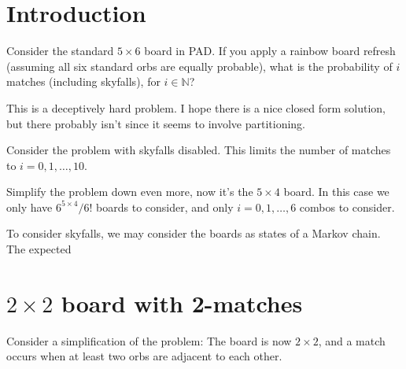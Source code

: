 \documentclass[12pt]{article}
\newcommand{\N}{\mathbb{N}}
\begin{document}
\section{Introduction}
Consider the standard $5\times 6$ board in PAD. If you apply a rainbow board refresh (assuming all six standard orbs are equally probable), what is the probability of $i$ matches (including skyfalls), for $i\in\N$?

This is a deceptively hard problem. I hope there is a nice closed form solution, but there probably isn't since it seems to involve partitioning.

Consider the problem with skyfalls disabled.
This limits the number of matches to $i=0,1,\dots,10$.

Simplify the problem down even more, now it's the $5\times 4$ board. In this case we only have $6^{5\times 4}/6!$ boards to consider, and only $i=0,1,\dots,6$ combos to consider.

To consider skyfalls, we may consider the boards as states of a Markov chain. The expected 

\section{$2\times2$ board with 2-matches}
Consider a simplification of the problem:
The board is now $2 \times 2$, and a match occurs when at least two orbs are adjacent to each other.
\end{document}
